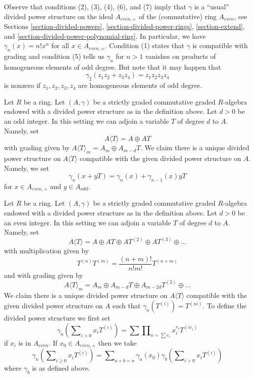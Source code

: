 \noindent
Observe that conditions (2), (3), (4), (6), and (7) imply that
$\gamma$ is a ``usual'' divided power structure on the ideal
$A_{even, +}$ of the (commutative) ring $A_{even}$, see
Sections \ref{section-divided-powers},
\ref{section-divided-power-rings},
\ref{section-extend}, and
\ref{section-divided-power-polynomial-ring}.
In particular, we have $\gamma_n(x) = n! x^n$ for all $x \in A_{even, +}$.
Condition (1) states that $\gamma$ is compatible with grading and condition
(5) tells us $\gamma_n$ for $n > 1$ vanishes on products
of homogeneous elements of odd degree. But note that it may happen
that
$$
\gamma_2(z_1 z_2 + z_3 z_4) = z_1z_2z_3z_4
$$
is nonzero if $z_1, z_2, z_3, z_4$ are homogeneous elements of odd degree.

\begin{example}
\label{example-adjoining-odd}
Let $R$ be a ring. Let $(A, \gamma)$ be a strictly graded commutative
graded $R$-algebra endowed with a divided power structure as in the
definition above. Let $d > 0$ be an odd integer.
In this setting we can adjoin a variable $T$ of degree $d$ to $A$.
Namely, set
$$
A\langle T \rangle = A \oplus AT
$$
with grading given by $A\langle T \rangle_m = A_m \oplus A_{m - d}T$.
We claim there is a unique divided power structure on
$A\langle T \rangle$ compatible with the given divided power
structure on $A$. Namely, we set
$$
\gamma_n(x + yT) = \gamma_n(x) + \gamma_{n - 1}(x)yT
$$
for $x \in A_{even, +}$ and $y \in A_{odd}$.
\end{example}

\begin{example}
\label{example-adjoining-even}
Let $R$ be a ring. Let $(A, \gamma)$ be a strictly graded commutative
graded $R$-algebra endowed with a divided power structure as in the
definition above. Let $d > 0$ be an even integer.
In this setting we can adjoin a variable $T$ of degree $d$ to $A$.
Namely, set
$$
A\langle T \rangle = A \oplus AT \oplus AT^{(2)} \oplus AT^{(3)} \oplus \ldots
$$
with multiplication given by
$$
T^{(n)} T^{(m)} = \frac{(n + m)!}{n!m!} T^{(n + m)}
$$
and with grading given by
$$
A\langle T \rangle_m =
A_m \oplus A_{m - d}T \oplus A_{m - 2d}T^{(2)} \oplus \ldots
$$
We claim there is a unique divided power structure on
$A\langle T \rangle$ compatible with the given divided power
structure on $A$ such that $\gamma_n(T^{(i)}) = T^{(ni)}$.
To define the divided power structure we first set
$$
\gamma_n\left(\sum\nolimits_{i > 0} x_i T^{(i)}\right) =
\sum \prod\nolimits_{n = \sum e_i} x_i^{e_i} T^{(ie_i)}
$$
if $x_i$ is in $A_{even}$. If $x_0 \in A_{even, +}$
then we take
$$
\gamma_n\left(\sum\nolimits_{i \geq 0} x_i T^{(i)}\right) =
\sum\nolimits_{a + b = n}
\gamma_a(x_0)\gamma_b\left(\sum\nolimits_{i > 0} x_iT^{(i)}\right)
$$
where $\gamma_b$ is as defined above.
\end{example}

